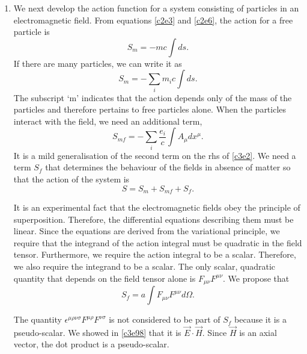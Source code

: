 \begin{enumerate}
\item We next develop the action function for a system consisting of particles
in an electromagnetic field. From equations \eqref{c2e3} and \eqref{c2e6}, the
action for a free particle is
\begin{equation}\label{c4e8}
S_m = -mc\int ds.
\end{equation}
If there are many particles, we can write it as
\begin{equation}\label{c4e9}
S_m = -\sum_i m_ic\int ds.
\end{equation}
The subscript `m' indicates that the action depends only of the mass of the 
particles and therefore pertains to free particles alone. When the particles
interact with the field, we need an additional term,
\begin{equation}\label{c4e10}
S_{mf} = -\sum_i \frac{e_i}{c}\int A_\mu dx^\mu.
\end{equation}
It is a mild generalisation of the second term on the rhs of \eqref{c3e2}.
We need a term $S_f$ that determines the behaviour of the fields in absence of
matter so that the action of the system is
\begin{equation}\label{c4e11}
S = S_m + S_{mf} + S_f.
\end{equation}

It is an experimental fact that the electromagnetic fields obey the principle of
superposition. Therefore, the differential equations describing them must be 
linear.  Since the equations are derived from the variational principle, we 
require that the integrand of the action integral must be quadratic in the field
tensor. Furthermore, we require the action integral to be a scalar. Therefore, 
we also require the integrand to be a scalar. The only scalar, quadratic 
quantity that depends on the field tensor alone is $F_{\mu\nu}F^{\mu\nu}$. 
We propose that
\begin{equation}\label{c4e12}
S_f = a\int F_{\mu\nu}F^{\mu\nu} d\Omega.
\end{equation}

The quantity $\epsilon^{\mu\rho\nu\sigma}F^{\mu\rho}F^{\nu\sigma}$ is not 
considered to be part of $S_f$ because it is a pseudo-scalar. We showed in 
\eqref{c3e98} that it is $\vec{E}\cdot\vec{H}$. Since $\vec{H}$ is an axial 
vector, the dot product is a pseudo-scalar.


\end{enumerate}
